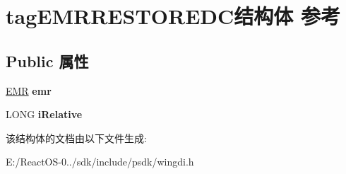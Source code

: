 \hypertarget{structtag_e_m_r_r_e_s_t_o_r_e_d_c}{}\section{tag\+E\+M\+R\+R\+E\+S\+T\+O\+R\+E\+D\+C结构体 参考}
\label{structtag_e_m_r_r_e_s_t_o_r_e_d_c}
\subsection*{Public 属性}
\begin{DoxyCompactItemize}
\item 
\mbox{\label{structtag_e_m_r_r_e_s_t_o_r_e_d_c_af812a0c67c6e460d5241e6f94e8e111c}} 
\hyperlink{structtag_e_m_r}{E\+MR} {\bfseries emr}
\item 
\mbox{\label{structtag_e_m_r_r_e_s_t_o_r_e_d_c_acaa6c67d678ccbdc904f2bd428d2e5b6}} 
L\+O\+NG {\bfseries i\+Relative}
\end{DoxyCompactItemize}


该结构体的文档由以下文件生成\+:\begin{DoxyCompactItemize}
\item 
E\+:/\+React\+O\+S-\/0../sdk/include/psdk/wingdi.\+h\end{DoxyCompactItemize}
